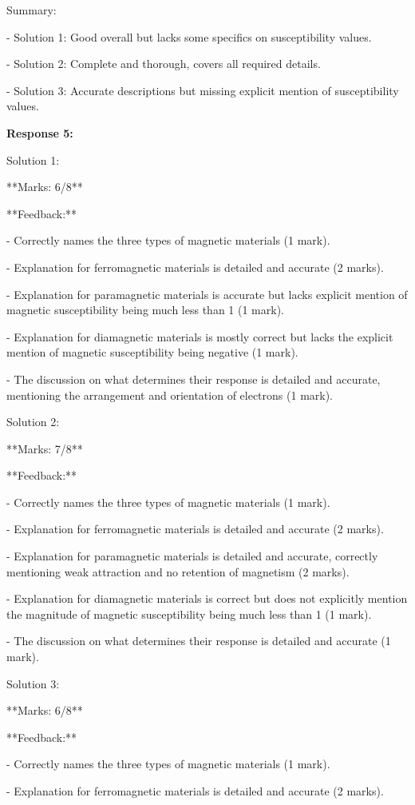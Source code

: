 \documentclass[a4paper,11pt]{article}
\begin{document}
Summary:

- Solution 1: Good overall but lacks some specifics on susceptibility values.

- Solution 2: Complete and thorough, covers all required details.

- Solution 3: Accurate descriptions but missing explicit mention of susceptibility values.

\bigskip    
\textbf{Response 5:}

Solution 1:

**Marks: 6/8**

**Feedback:**

- Correctly names the three types of magnetic materials (1 mark).

- Explanation for ferromagnetic materials is detailed and accurate (2 marks).

- Explanation for paramagnetic materials is accurate but lacks explicit mention of magnetic susceptibility being much less than 1 (1 mark).

- Explanation for diamagnetic materials is mostly correct but lacks the explicit mention of magnetic susceptibility being negative (1 mark).

- The discussion on what determines their response is detailed and accurate, mentioning the arrangement and orientation of electrons (1 mark).

Solution 2:

**Marks: 7/8**

**Feedback:**

- Correctly names the three types of magnetic materials (1 mark).

- Explanation for ferromagnetic materials is detailed and accurate (2 marks).

- Explanation for paramagnetic materials is detailed and accurate, correctly mentioning weak attraction and no retention of magnetism (2 marks).

- Explanation for diamagnetic materials is correct but does not explicitly mention the magnitude of magnetic susceptibility being much less than 1 (1 mark).

- The discussion on what determines their response is detailed and accurate (1 mark).

Solution 3:

**Marks: 6/8**

**Feedback:**

- Correctly names the three types of magnetic materials (1 mark).

- Explanation for ferromagnetic materials is detailed and accurate (2 marks).
\end{document}
